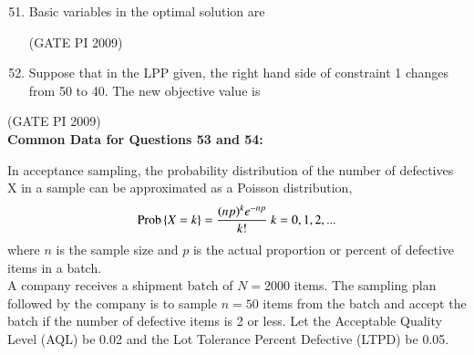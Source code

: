 \documentclass[journal,12pt,onecolumn]{IEEEtran}
\theoremstyle{remark}
\begin{document}
\begin{enumerate}[label=Q.\arabic*, leftmargin=*]
\setcounter{enumi}{50}

\item Basic variables in the optimal solution are
\begin{enumerate}
\end{enumerate}
\hfill (GATE PI 2009)
\item Suppose that in the LPP given, the right hand side of constraint 1 changes from 50 to 40. The new objective value is
\begin{enumerate}
\end{enumerate}
\end{enumerate}
\hfill (GATE PI 2009) \\
\textbf{Common Data for Questions 53 and 54:}


In acceptance sampling, the probability distribution of the number of defectives X in a sample can be approximated as a Poisson distribution,\\
$$\text{Prob}\left\{X = k\right\}  = \frac{(np)^k e^{-np}}{k!}\ k=0,1,2,...$$
where $n$ is the sample size and $p$ is the actual proportion or percent of defective items in a batch.\\

A company receives a shipment batch of $N = 2000$ items. The sampling plan followed by the company is to sample $n = 50$ items from the batch and accept the batch if the number of defective items is 2 or less. Let the Acceptable Quality Level (AQL) be 0.02 and the Lot Tolerance Percent Defective (LTPD) be 0.05.
\end{document}

